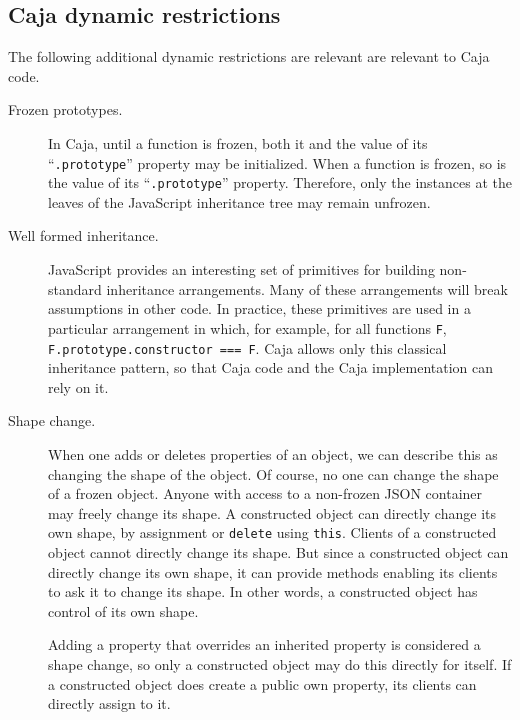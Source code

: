 \documentclass[letterpaper,twocolumn,10pt]{article}
\newcommand{\code}[1]{{\tt {#1}}}              %
\begin{document}


\subsection{Caja dynamic restrictions}

The following additional dynamic restrictions are relevant are relevant to
Caja code.

\begin{description}

  \item[Frozen prototypes.] In Caja, until a function is frozen, both it and 
  the value of its ``\code{.prototype}'' property may be initialized. When a 
  function is frozen, so is the value of its ``\code{.prototype}'' property. 
  Therefore, only the instances at the leaves of the JavaScript inheritance 
  tree may remain unfrozen.
  
   \item[Well formed inheritance.] JavaScript provides an interesting set of 
   primitives for building non-standard inheritance arrangements. Many of 
   these arrangements will break assumptions in other code. In practice, 
   these primitives are used in a particular arrangement in which, for 
   example, for all functions \code{F}, \code{F.prototype.constructor === F}. 
   Caja allows only this classical inheritance pattern, so that Caja code and 
   the Caja implementation can rely on it.
   
   \item[Shape change.] When one adds or deletes properties of an object, we 
   can describe this as changing the shape of the object. Of course, no one 
   can change the shape of a frozen object. Anyone with access to a 
   non-frozen JSON container may freely change its shape. A constructed 
   object can directly change its own shape, by assignment or \code{delete} 
   using \code{this}. Clients of a constructed object cannot directly change 
   its shape. But since a constructed object can directly change its own 
   shape, it can provide methods enabling its clients to ask it to change its 
   shape. In other words, a constructed object has control of its own shape.
   
   Adding a property that overrides an inherited property is considered a 
   shape change, so only a constructed object may do this directly for 
   itself. If a constructed object does create a public own property, its 
   clients can directly assign to it.
   

\end{description}
\end{document}
